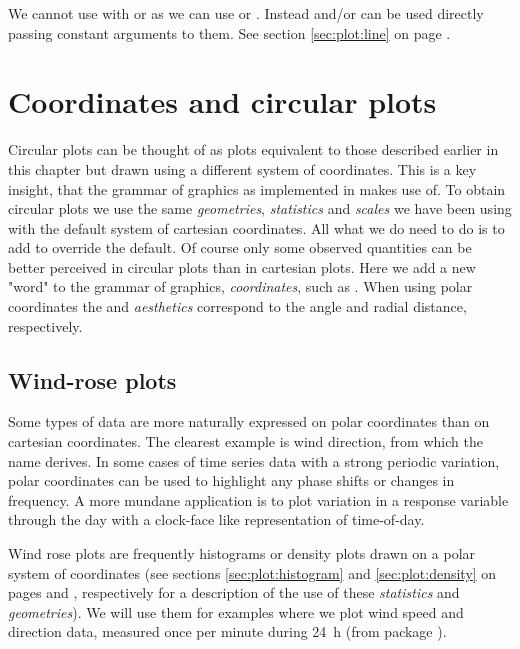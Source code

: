 \documentclass[krantz2]{krantz}\usepackage{knitr}%
\begin{document}
\begin{infobox}
We cannot use  with  or  as we can use  or . Instead  and/or   can be used directly passing constant arguments to them. See section \ref{sec:plot:line} on page \pageref{sec:plot:vhline}.
\end{infobox}

\section{Coordinates and circular plots}\label{sec:plot:circular}\label{sec:plot:coord}
Circular plots can be thought of as plots equivalent to those described earlier in this chapter but drawn using a different system of coordinates. This is a key insight, that the grammar of graphics as implemented in \ggplot makes use of. To obtain circular plots we use the same \emph{geometries}, \emph{statistics} and \emph{scales} we have been using with the default system of cartesian coordinates. All what we do need to do is to add  to override the default. Of course only some observed quantities can be better perceived in circular plots than in cartesian plots. Here we add a new "word" to the grammar of graphics, \textit{coordinates}, such as .
When using polar coordinates the  and  \textit{aesthetics} correspond to the angle and radial distance, respectively.

\subsection{Wind-rose plots}
Some types of data are more naturally expressed on polar coordinates than on cartesian coordinates. The clearest example is wind direction, from which the name derives. In some cases of time series data with a strong periodic variation, polar coordinates can be used to highlight any phase shifts or changes in frequency. A more mundane application is to plot variation in a response variable through the day with a clock-face like representation of time-of-day.

Wind rose plots are frequently histograms or density plots drawn on a polar system of coordinates (see sections \ref{sec:plot:histogram} and \ref{sec:plot:density} on pages \pageref{sec:plot:histogram} and \pageref{sec:plot:density}, respectively for a description of the use of these \emph{statistics} and \emph{geometries}). We will use them for examples where we plot wind speed and direction data, measured once per minute during 24~h (from package ).
\end{document}
